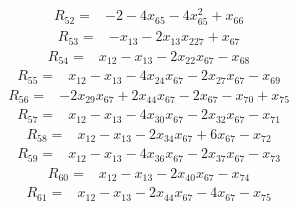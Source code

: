 \begin{equation*}\begin{split}
R_{52}={}&-2 - 4x_{65} - 4x_{65}^{2} + x_{66}
\end{split}\end{equation*}
\begin{equation*}\begin{split}
R_{53}={}&-x_{13} - 2x_{13} x_{227} + x_{67}
\end{split}\end{equation*}
\begin{equation*}\begin{split}
R_{54}={}&x_{12} - x_{13} - 2x_{22} x_{67} - x_{68}
\end{split}\end{equation*}
\begin{equation*}\begin{split}
R_{55}={}&x_{12} - x_{13} - 4x_{24} x_{67} - 2x_{27} x_{67} - x_{69}
\end{split}\end{equation*}
\begin{equation*}\begin{split}
R_{56}={}&-2x_{29} x_{67} + 2x_{44} x_{67} - 2x_{67} - x_{70} + x_{75}
\end{split}\end{equation*}
\begin{equation*}\begin{split}
R_{57}={}&x_{12} - x_{13} - 4x_{30} x_{67} - 2x_{32} x_{67} - x_{71}
\end{split}\end{equation*}
\begin{equation*}\begin{split}
R_{58}={}&x_{12} - x_{13} - 2x_{34} x_{67} + 6x_{67} - x_{72}
\end{split}\end{equation*}
\begin{equation*}\begin{split}
R_{59}={}&x_{12} - x_{13} - 4x_{36} x_{67} - 2x_{37} x_{67} - x_{73}
\end{split}\end{equation*}
\begin{equation*}\begin{split}
R_{60}={}&x_{12} - x_{13} - 2x_{40} x_{67} - x_{74}
\end{split}\end{equation*}
\begin{equation*}\begin{split}
R_{61}={}&x_{12} - x_{13} - 2x_{44} x_{67} - 4x_{67} - x_{75}
\end{split}\end{equation*}

